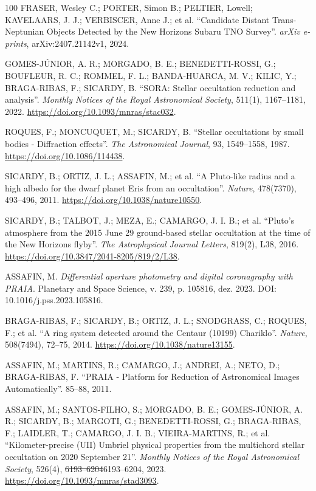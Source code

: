 \documentclass[msc]{on} %
\makeatletter
\providecommand{\DIFaddtex}[1]{{\protect\color{red}#1}} %
\providecommand{\DIFdeltex}[1]{{\protect\color{red}\sout{#1}}} %
\providecommand{\DIFaddbegin}{} %
\providecommand{\DIFaddend}{} %
\providecommand{\DIFdelbegin}{} %
\providecommand{\DIFdelend}{} %
\providecommand{\DIFadd}[1]{\texorpdfstring{\DIFaddtex{#1}}{#1}} %
\providecommand{\DIFdel}[1]{\texorpdfstring{\DIFdeltex{#1}}{}} %
\let\sout@orig\sout %
\renewcommand{\sout}[1]{\ifmmode\text{\sout@orig{\ensuremath{#1}}}\else\sout@orig{#1}\fi} %
\makeatother
\begin{document}
\begin{thebibliography}{100}
 FRASER, Wesley C.; PORTER, Simon B.; PELTIER, Lowell; KAVELAARS, J. J.; VERBISCER, Anne J.; et al. ``Candidate Distant Trans-Neptunian Objects Detected by the New Horizons Subaru TNO Survey''. \emph{arXiv e-prints}, arXiv:2407.21142v1, 2024.

 GOMES-JÚNIOR, A. R.; MORGADO, B. E.; BENEDETTI-ROSSI, G.; BOUFLEUR, R. C.; ROMMEL, F. L.; BANDA-HUARCA, M. V.; KILIC, Y.; BRAGA-RIBAS, F.; SICARDY, B. ``SORA: Stellar occultation reduction and analysis''. \emph{Monthly Notices of the Royal Astronomical Society}, 511(1), 1167--1181, 2022. \url{https://doi.org/10.1093/mnras/stac032}.

 ROQUES, F.; MONCUQUET, M.; SICARDY, B. ``Stellar occultations by small bodies - Diffraction effects''. \emph{The Astronomical Journal}, 93, 1549--1558, 1987. \url{https://doi.org/10.1086/114438}.

 SICARDY, B.; ORTIZ, J. L.; ASSAFIN, M.; et al. ``A Pluto-like radius and a high albedo for the dwarf planet Eris from an occultation''. \emph{Nature}, 478(7370), 493--496, 2011. \url{https://doi.org/10.1038/nature10550}.

 SICARDY, B.; TALBOT, J.; MEZA, E.; CAMARGO, J. I. B.; et al. ``Pluto's atmosphere from the 2015 June 29 ground-based stellar occultation at the time of the New Horizons flyby''. \emph{The Astrophysical Journal Letters}, 819(2), L38, 2016. \url{https://doi.org/10.3847/2041-8205/819/2/L38}.

 ASSAFIN, M. \textit{Differential aperture photometry and digital coronagraphy with PRAIA}. Planetary and Space Science, v. 239, p. 105816, dez. 2023. DOI: 10.1016/j.pss.2023.105816.

 BRAGA-RIBAS, F.; SICARDY, B.; ORTIZ, J. L.; SNODGRASS, C.; ROQUES, F.; et al. ``A ring system detected around the Centaur (10199) Chariklo''. \emph{Nature}, 508(7494), 72--75, 2014. \url{https://doi.org/10.1038/nature13155}.

 ASSAFIN, M.; MARTINS, R.; CAMARGO, J.; ANDREI, A.; NETO, D.; BRAGA-RIBAS, F. ``PRAIA - Platform for Reduction of Astronomical Images Automatically''. 85--88, 2011.

 ASSAFIN, M.; SANTOS-FILHO, S.; MORGADO, B. E.; GOMES-JÚNIOR, A. R.; SICARDY, B.; MARGOTI, G.; BENEDETTI-ROSSI, G.; BRAGA-RIBAS, F.; LAIDLER, T.; CAMARGO, J. I. B.; VIEIRA-MARTINS, R.; et al. ``Kilometer-precise (UII) Umbriel physical properties from the multichord stellar occultation on 2020 September 21''. \emph{Monthly Notices of the Royal Astronomical Society}, 526(4), \DIFdelbegin \DIFdel{6193–6204}\DIFdelend\ifhmode\hskip0pt\fi \DIFaddbegin \DIFadd{6193--6204}\DIFaddend , 2023. \url{https://doi.org/10.1093/mnras/stad3093}.


\end{thebibliography}
\end{document}

